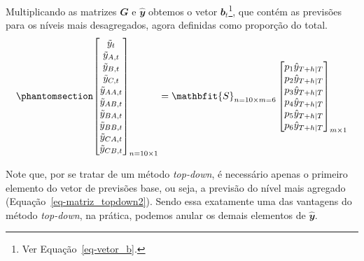 \documentclass[
  12pt,
  twoside,
  openright,
  a4paper,
  chapter=TITLE,
  section=TITLE,
  brazil]{abntex2}
\begin{document}
Multiplicando as matrizes \(\mathbfit{G}\) e \(\mathbfit{\hat{y}}\)
obtemos o vetor \(\mathbfit{b}_t\)\footnote{Ver
  Equação~\ref{eq-vetor_b}.}, que contém as previsões para os níveis
mais desagregados, agora definidas como proporção do total.
\begin{equation}\phantomsection\label{eq-matriz_topdown2}{
\begin{bmatrix}
    \tilde{y}_{t} \\
    \tilde{y}_{A, t} \\
    \tilde{y}_{B, t} \\
    \tilde{y}_{C, t} \\
    \tilde{y}_{AA, t} \\
    \tilde{y}_{AB, t} \\
    \tilde{y}_{BA, t} \\
    \tilde{y}_{BB, t} \\
    \tilde{y}_{CA, t} \\
    \tilde{y}_{CB, t}
\end{bmatrix}_{n=10 \times 1}
=
\mathbfit{S}_{n=10 \times m=6}
\begin{bmatrix}
    p_1\hat{y}_{T+h|T} \\
    p_2\hat{y}_{T+h|T} \\
    p_3\hat{y}_{T+h|T} \\
    p_4\hat{y}_{T+h|T} \\
    p_5\hat{y}_{T+h|T} \\
    p_6\hat{y}_{T+h|T}
\end{bmatrix}_{m \times 1}
}\end{equation}

Note que, por se tratar de um método \emph{top-down}, é necessário
apenas o primeiro elemento do vetor de previsões base, ou seja, a
previsão do nível mais agregado (Equação~\ref{eq-matriz_topdown2}).
Sendo essa exatamente uma das vantagens do método \emph{top-down}, na
prática, podemos anular os demais elementos de \(\mathbfit{\hat{y}}\).
\end{document}
